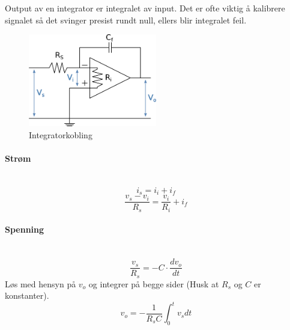 Output av en integrator er integralet av input.
Det er ofte viktig å kalibrere signalet så det svinger presist rundt null,
ellers blir integralet feil.

\begin{figure}[H]
  \caption{Integratorkobling}
  \centering
  \includegraphics[width=0.5\textwidth]{./img/integrator}
\end{figure}



\paragraph{Strøm} \mbox{} \\
$$i_s = i_i + i_f$$
$$\frac{v_s - v_i}{R_s} = \frac{v_i}{R_i} + i_f$$



\paragraph{Spenning} \mbox{} \\
$$\frac{v_s}{R_s} = -C \cdot \frac{dv_o}{dt}$$
Løs med hensyn på $v_o$ og integrer på begge sider (Husk at $R_s$ og $C$
er konstanter).
$$v_o = -\frac{1}{R_sC} \int_0^t v_s dt$$

